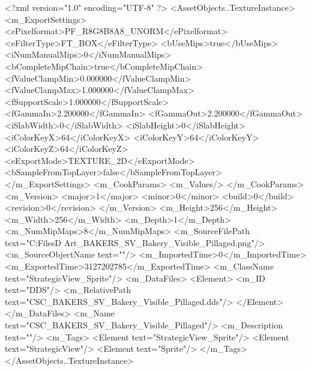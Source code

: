 <?xml version="1.0" encoding="UTF-8" ?>
<AssetObjects..TextureInstance>
	<m_ExportSettings>
		<ePixelformat>PF_R8G8B8A8_UNORM</ePixelformat>
		<eFilterType>FT_BOX</eFilterType>
		<bUseMips>true</bUseMips>
		<iNumManualMips>0</iNumManualMips>
		<bCompleteMipChain>true</bCompleteMipChain>
		<fValueClampMin>0.000000</fValueClampMin>
		<fValueClampMax>1.000000</fValueClampMax>
		<fSupportScale>1.000000</fSupportScale>
		<fGammaIn>2.200000</fGammaIn>
		<fGammaOut>2.200000</fGammaOut>
		<iSlabWidth>0</iSlabWidth>
		<iSlabHeight>0</iSlabHeight>
		<iColorKeyX>64</iColorKeyX>
		<iColorKeyY>64</iColorKeyY>
		<iColorKeyZ>64</iColorKeyZ>
		<eExportMode>TEXTURE_2D</eExportMode>
		<bSampleFromTopLayer>false</bSampleFromTopLayer>
	</m_ExportSettings>
	<m_CookParams>
		<m_Values/>
	</m_CookParams>
	<m_Version>
		<major>1</major>
		<minor>0</minor>
		<build>0</build>
		<revision>0</revision>
	</m_Version>
	<m_Height>256</m_Height>
	<m_Width>256</m_Width>
	<m_Depth>1</m_Depth>
	<m_NumMipMaps>8</m_NumMipMaps>
	<m_SourceFilePath text="C:\Users\Shadow\Desktop\Working Files\2D Art\Quarters\Bakers\StrategicView\CSC_BAKERS_SV_Bakery_Visible_Pillaged.png"/>
	<m_SourceObjectName text=""/>
	<m_ImportedTime>0</m_ImportedTime>
	<m_ExportedTime>3127202785</m_ExportedTime>
	<m_ClassName text="StrategicView_Sprite"/>
	<m_DataFiles>
		<Element>
			<m_ID text="DDS"/>
			<m_RelativePath text="CSC_BAKERS_SV_Bakery_Visible_Pillaged.dds"/>
		</Element>
	</m_DataFiles>
	<m_Name text="CSC_BAKERS_SV_Bakery_Visible_Pillaged"/>
	<m_Description text=""/>
	<m_Tags>
		<Element text="StrategicView_Sprite"/>
		<Element text="StrategicView"/>
		<Element text="Sprite"/>
	</m_Tags>
</AssetObjects..TextureInstance>

